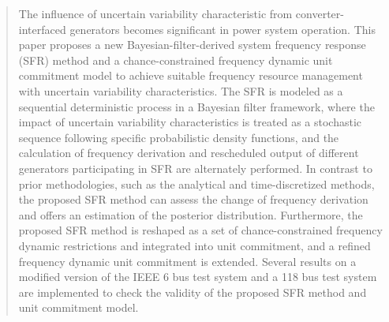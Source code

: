 \documentclass[lettersize,journal]{IEEEtran}
\begin{document}
\maketitle
\vspace{-2.5em}
\begin{abstract}

	The influence of uncertain variability characteristic from converter-interfaced generators becomes significant in power system operation. This paper proposes a new Bayesian-filter-derived system frequency response (SFR) method and a chance-constrained frequency dynamic unit commitment model to achieve suitable frequency resource management with uncertain variability characteristics. The SFR is modeled as a sequential deterministic process in a Bayesian filter framework, where the impact of uncertain variability characteristics is treated as a stochastic sequence following specific probabilistic density functions, and the calculation of frequency derivation and rescheduled output of different generators participating in SFR are alternately performed. In contrast to prior methodologies, such as the analytical and time-discretized methods, the proposed SFR method can assess the change of frequency derivation and offers an estimation of the posterior distribution. Furthermore, the proposed SFR method is reshaped as a set of chance-constrained frequency dynamic restrictions and integrated into unit commitment, and a refined frequency dynamic unit commitment is extended. Several results on a modified version of the IEEE 6 bus test system and a 118 bus test system are implemented to check the validity of the proposed SFR method and unit commitment model.
\end{abstract}
\end{document}
